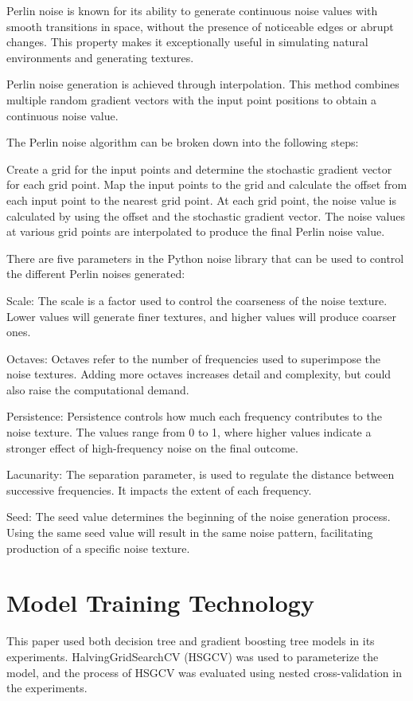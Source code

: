\documentclass[runningheads,a4paper]{llncs}
\begin{document}
Perlin noise is known for its ability to generate continuous noise values with smooth transitions in space, without the presence of noticeable edges or abrupt changes. This property makes it exceptionally useful in simulating natural environments and generating textures\cite{perlin1985image}.

Perlin noise generation is achieved through interpolation. This method combines multiple random gradient vectors with the input point positions to obtain a continuous noise value\cite{green2005implementing}. 

The Perlin noise algorithm can be broken down into the following steps:

Create a grid for the input points and determine the stochastic gradient vector for each grid point.
Map the input points to the grid and calculate the offset from each input point to the nearest grid point.
At each grid point, the noise value is calculated by using the offset and the stochastic gradient vector.
The noise values at various grid points are interpolated to produce the final Perlin noise value.\cite{green2005implementing}

There are five parameters in the Python noise library that can be used to control the different Perlin noises generated:

Scale: The scale is a factor used to control the coarseness of the noise texture. Lower values will generate finer textures, and higher values will produce coarser ones.

Octaves: Octaves refer to the number of frequencies used to superimpose the noise textures. Adding more octaves increases detail and complexity, but could also raise the computational demand.

Persistence: Persistence controls how much each frequency contributes to the noise texture. The values range from 0 to 1, where higher values indicate a stronger effect of high-frequency noise on the final outcome.

Lacunarity: The separation parameter, is used to regulate the distance between successive frequencies. It impacts the extent of each frequency.

Seed: The seed value determines the beginning of the noise generation process. Using the same seed value will result in the same noise pattern, facilitating production of a specific noise texture.

\section{Model Training Technology}

This paper used both decision tree and gradient boosting tree models in its experiments. HalvingGridSearchCV (HSGCV) was used to parameterize the model, and the process of HSGCV was evaluated using nested cross-validation in the experiments.

\newpage




\end{document}
